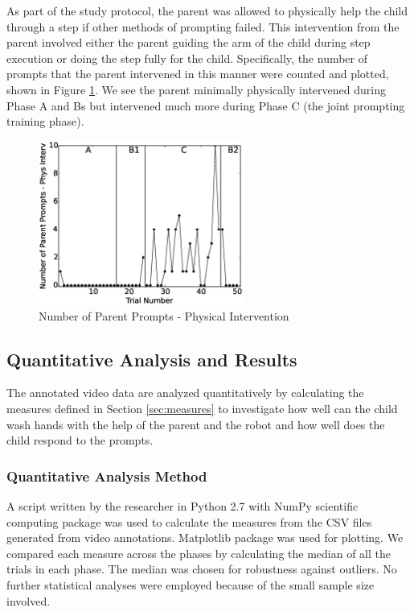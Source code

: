 \documentclass{ut-thesis}
\begin{document}
As part of the study protocol, the parent was allowed to physically help the child through a step if other methods of prompting failed.  This intervention from the parent involved either the parent guiding the arm of the child during step execution or doing the step fully for the child.  Specifically, the number of prompts that the parent intervened in this manner were counted and plotted, shown in Figure \ref{fig:7NumberofParentPrompts-PhysInterv}.  We see the parent minimally physically intervened during Phase A and Bs but intervened much more during Phase C (the joint prompting training phase).
\begin{figure} [h]
	\centering
	\includegraphics[width=0.6\textwidth]{./img/data_analysis/7NumberofParentPrompts-PhysInterv.eps}
	\caption{Number of Parent Prompts - Physical Intervention}
	\label{fig:7NumberofParentPrompts-PhysInterv}
\end{figure}


\subsection{Quantitative Analysis and Results}
\label{sec:QuantitativeData_results}
The annotated video data are analyzed quantitatively by calculating the measures defined in Section \ref{sec:measures} to investigate how well can the child wash hands with the help of the parent and the robot and how well does the child respond to the prompts.

\subsubsection{Quantitative Analysis Method}
A script written by the researcher in Python 2.7 with NumPy scientific computing package was used to calculate the measures from the CSV files generated from video annotations.  Matplotlib package was used for plotting.  We compared each measure across the phases by calculating the median of all the trials in each phase.  The median was chosen for robustness against outliers.  No further statistical analyses were employed because of the small sample size involved.
\end{document}
